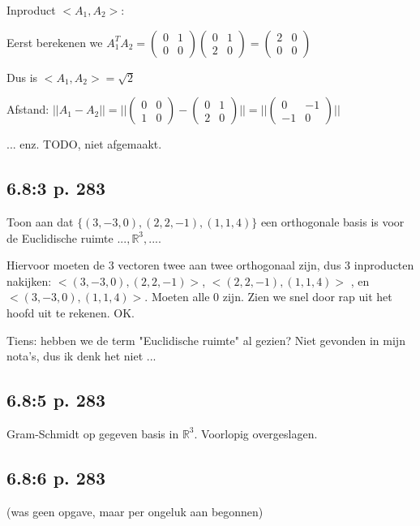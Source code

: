 \documentclass{article}
\begin{document}
Inproduct $<A_1, A_2>$: 

Eerst berekenen we $ A_1^T  A_2 = \begin{pmatrix} 0 & 1 \\ 0 & 0  \end{pmatrix} \begin{pmatrix} 0 & 1 \\ 2 & 0  \end{pmatrix} =\begin{pmatrix} 2 & 0 \\ 0 & 0  \end{pmatrix}  $

Dus is $<A_1, A_2> = \sqrt{2} $

Afstand: $ || A_1 - A_2 || = ||  \begin{pmatrix} 0 & 0 \\ 1 & 0  \end{pmatrix}  - \begin{pmatrix} 0 & 1 \\ 2 & 0  \end{pmatrix}  || = || \begin{pmatrix} 0 & -1  \\ -1 & 0  \end{pmatrix}  || $

... enz. TODO, niet afgemaakt. 

\subsection*{6.8:3 p. 283}

Toon aan dat $\{ (3,-3,0),(2,2,-1),(1,1,4)  \}$ een orthogonale basis is voor de Euclidische ruimte $...,\mathbb{R}^3,...$. 

Hiervoor moeten de 3 vectoren twee aan twee orthogonaal zijn, dus 3 inproducten nakijken: 
$<(3,-3,0),(2,2,-1)>$, $<(2,2,-1),(1,1,4)  >$ , en 
 $< (3,-3,0),(1,1,4) >$. Moeten alle 0 zijn. Zien we snel door rap uit het hoofd uit te rekenen. OK. 

Tiens: hebben we de term "Euclidische ruimte" al gezien? Niet gevonden in mijn nota's, dus ik denk het niet ... 
 
\subsection*{6.8:5 p. 283}

Gram-Schmidt op gegeven basis in $\mathbb{R}^3$. Voorlopig overgeslagen.  


\subsection*{6.8:6 p. 283}
(was geen opgave, maar per ongeluk aan begonnen) 
\end{document}

